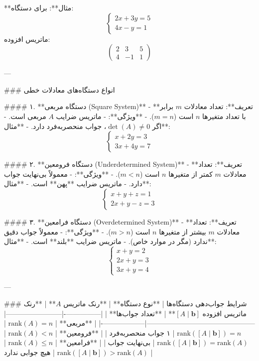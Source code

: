 **مثال**:
برای دستگاه:
\[
\begin{cases}
	2x + 3y = 5 \\
	4x - y = 1
\end{cases}
\]
ماتریس افزوده:
\[
\left(
\begin{array}{cc|c}
	2 & 3 & 5 \\
	4 & -1 & 1
\end{array}
\right)
\]

---

### انواع دستگاه‌های معادلات خطی

#### ۱. **دستگاه مربعی (Square System)**
- **تعریف**: تعداد معادلات \( m \) برابر با تعداد متغیرها \( n \) است (\( m = n \)).
- **ویژگی**:
- ماتریس ضرایب \( A \) مربعی است.
- اگر \( \det(A) \neq 0 \)، جواب منحصربه‌فرد دارد.
- **مثال**:
\[
\begin{cases}
	x + 2y = 3 \\
	3x + 4y = 7
\end{cases}
\]

#### ۲. **دستگاه فرومعین (Underdetermined System)**
- **تعریف**: تعداد معادلات \( m \) کمتر از متغیرها \( n \) است (\( m < n \)).
- **ویژگی**:
- معمولاً بی‌نهایت جواب دارد.
- ماتریس ضرایب **پهن** است.
- **مثال**:
\[
\begin{cases}
	x + y + z = 1 \\
	2x + y - z = 3
\end{cases}
\]

#### ۳. **دستگاه فرامعین (Overdetermined System)**
- **تعریف**: تعداد معادلات \( m \) بیشتر از متغیرها \( n \) است (\( m > n \)).
- **ویژگی**:
- معمولاً جواب دقیق ندارد (مگر در موارد خاص).
- ماتریس ضرایب **بلند** است.
- **مثال**:
\[
\begin{cases}
	x + y = 2 \\
	2x + y = 3 \\
	3x + y = 4
\end{cases}
\]

---

### شرایط جواب‌دهی دستگاه‌ها
| **نوع دستگاه** | **رنک ماتریس \( A \)** | **رنک ماتریس افزوده \([A \mid \mathbf{b}]\)** | **تعداد جواب‌ها** |
|----------------|------------------------|-----------------------------------------------|-------------------|
| **مربعی**      | \( \text{rank}(A) = n \) | \( \text{rank}([A \mid \mathbf{b}]) = n \)    | ۱ جواب منحصربه‌فرد |
| **فرومعین**    | \( \text{rank}(A) < n \) | \( \text{rank}([A \mid \mathbf{b}]) = \text{rank}(A) \) | بی‌نهایت جواب |
| **فرامعین**    | \( \text{rank}(A) \leq n \) | \( \text{rank}([A \mid \mathbf{b}]) > \text{rank}(A) \) | هیچ جوابی ندارد |

